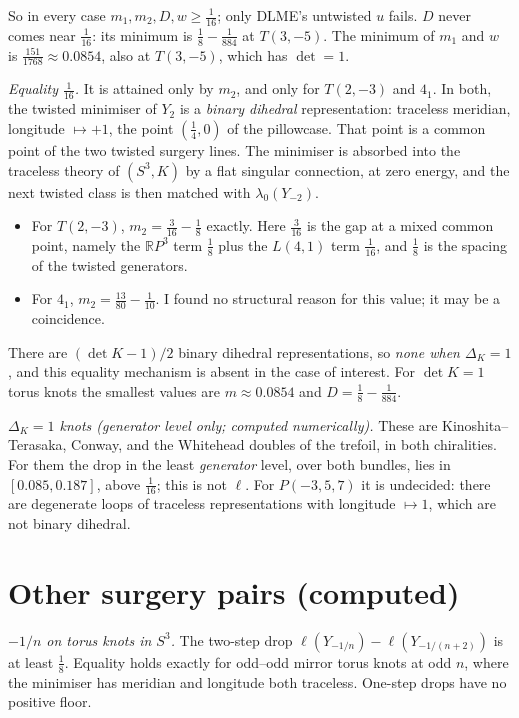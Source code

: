 \documentclass[10pt]{amsart}
\newcommand{\st}[1]{\par\noindent\textit{#1}\enspace}
\begin{document}
\noindent So in every case $m_1,m_2,D,w\ge\frac1{16}$; only DLME's untwisted
$u$ fails. $D$ never comes near $\frac1{16}$: its minimum is
$\frac18-\frac1{884}$ at $T(3,-5)$. The minimum of $m_1$ and $w$ is
$\frac{151}{1768}\approx0.0854$, also at $T(3,-5)$, which has $\det=1$.

\st{Equality $\frac1{16}$.} It is attained only by $m_2$, and only for $T(2,-3)$
and $4_1$. In both, the twisted minimiser of $Y_2$ is a \emph{binary dihedral}
representation: traceless meridian, longitude $\mapsto+1$, the point
$(\frac14,0)$ of the pillowcase. That point is a common point of the two twisted
surgery lines. The minimiser is absorbed into the traceless theory of $(S^3,K)$
by a flat singular connection, at zero energy, and the next twisted class is then
matched with $\lambda_0(Y_{-2})$.
\begin{itemize}
\item For $T(2,-3)$, $m_2=\frac3{16}-\frac18$ exactly. Here $\frac3{16}$ is the gap
at a mixed common point, namely the $\mathbb RP^3$ term $\frac18$ plus the
$L(4,1)$ term $\frac1{16}$, and $\frac18$ is the spacing of the twisted
generators.
\item For $4_1$, $m_2=\frac{13}{80}-\frac1{10}$. I found no structural reason for
this value; it may be a coincidence.
\end{itemize}
There are $(\det K-1)/2$ binary dihedral representations, so \emph{none when
$\Delta_K=1$}, and this equality mechanism is absent in the case of interest.
For $\det K=1$ torus knots the smallest values are $m\approx0.0854$ and
$D=\frac18-\frac1{884}$.

\st{$\Delta_K=1$ knots (generator level only; computed numerically).} These are
Kinoshita--Terasaka, Conway, and the Whitehead doubles of the trefoil, in both
chiralities. For them the drop in the least \emph{generator} level, over both
bundles, lies in $[0.085,0.187]$, above $\frac1{16}$; this is not $\ell$. For
$P(-3,5,7)$ it is undecided: there are degenerate loops of traceless
representations with longitude $\mapsto1$, which are not binary dihedral.

\section{Other surgery pairs (computed)}

\st{$-1/n$ on torus knots in $S^3$.} The two-step drop
$\ell(Y_{-1/n})-\ell(Y_{-1/(n+2)})$ is at least $\frac18$. Equality holds exactly
for odd--odd mirror torus knots at odd $n$, where the minimiser has meridian and
longitude both traceless. One-step drops have no positive floor.
\end{document}
